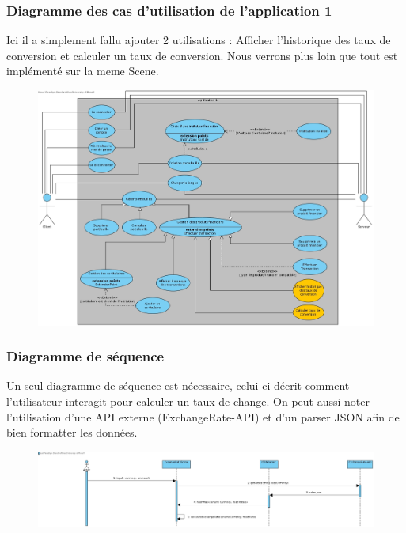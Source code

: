 \documentclass[../rapport.tex]{subfiles}
\begin{document}
\subsubsection{Diagramme des cas d'utilisation de l'application 1}
Ici il a simplement fallu ajouter 2 utilisations : Afficher l'historique des taux de conversion et calculer un taux de conversion. Nous verrons plus loin que tout est implémenté sur la meme Scene.
\begin{figure}[H]
    \includegraphics[scale=0.288]{ressources/photos_diagrammes/extensionUgo/useCaseApp1.jpg}
    \caption{}
\end{figure}

\subsubsection{Diagramme de séquence}
Un seul diagramme de séquence est nécessaire, celui ci décrit comment l'utilisateur interagit pour calculer un taux de change. On peut aussi noter l'utilisation d'une API externe (ExchangeRate-API) et d'un parser JSON afin de bien formatter les données.
\begin{figure}[H]
    \includegraphics[scale=0.24]{ressources/photos_diagrammes/extensionUgo/calculateExchangeRate.jpg}
\end{figure}
\end{document}
